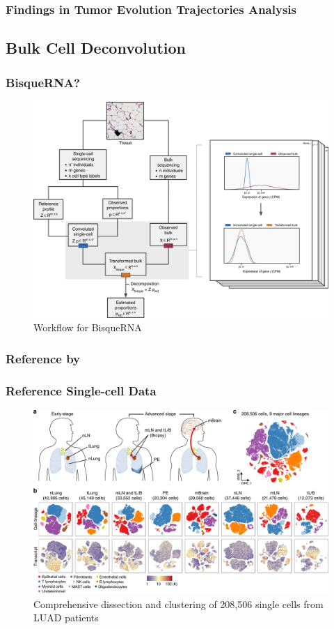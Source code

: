 \documentclass{beamer}
\begin{document}
    \begin{frame}
        \frametitle{Findings in Tumor Evolution Trajectories Analysis}
    \end{frame}

    \subsection{Bulk Cell Deconvolution}
    \begin{frame}
        \frametitle{BisqueRNA?}

        \begin{figure}
            \includegraphics[width=0.6 \linewidth]{figures/Workflow/Bisque.jpg}
            \caption{Workflow for BisqueRNA \protect\cite{Bisque1}}
        \end{figure}
    \end{frame}

    \subsubsection{Reference by \protect{}}
    \begin{frame}
        \frametitle{Reference Single-cell Data}

        \begin{figure}
            \includegraphics[width=0.8 \linewidth]{figures/LungCancer/reference_1.jpg}
            \caption{Comprehensive dissection and clustering of 208,506 single cells from LUAD patients \protect\cite{singlecell1}}
        \end{figure}
    \end{frame}
\end{document}
